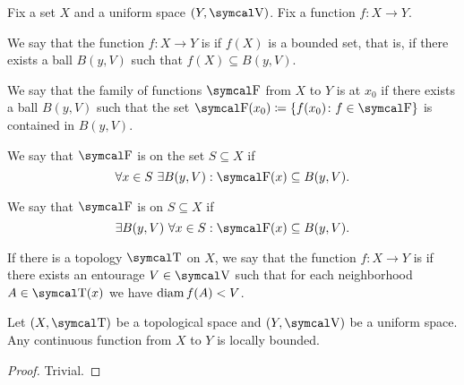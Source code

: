 \begin{definition}\label{def:bounded_function}
  Fix a set \( X \) and a uniform space \( (Y, \CV) \). Fix a function \( f: X \to Y \).

  \begin{defenum}
     We say that the function \( f: X \to Y \) is  if \( f(X) \) is a bounded set, that is, if there exists a ball \( B(y, V) \) such that \( f(X) \subseteq B(y, V) \).

     We say that the family of functions \( \CF \) from \( X \) to \( Y \) is  at \( x_0 \) if there exists a ball \( B(y, V) \) such that the set \( \CF(x_0) \coloneqq \{ f(x_0) \colon f \in \CF \} \) is contained in \( B(y, V) \).

     We say that \( \CF \) is  on the set \( S \subseteq X \) if
    \begin{equation*}
      \forall x \in S \ \exists B(y, V) : \CF(x) \subseteq B(y, V).
    \end{equation*}

     We say that \( \CF \) is  on \( S \subseteq X \) if
    \begin{equation*}
      \exists B(y, V) \ \forall x \in S : \CF(x) \subseteq B(y, V).
    \end{equation*}

     If there is a topology \( \CT \) on \( X \), we say that the function \( f: X \to Y \) is  if there exists an entourage \( V \in \CV \) such that for each neighborhood \( A \in \CT(x) \) we have \( \operatorname{diam}{f(A)} < V \).
  \end{defenum}
\end{definition}

\begin{proposition}\label{thm:continuous_implies_locally_bounded}
  Let \( (X, \CT) \) be a topological space and \( (Y, \CV) \) be a uniform space. Any continuous function from \( X \) to \( Y \) is locally bounded.
\end{proposition}
\begin{proof}
  Trivial.
\end{proof}

